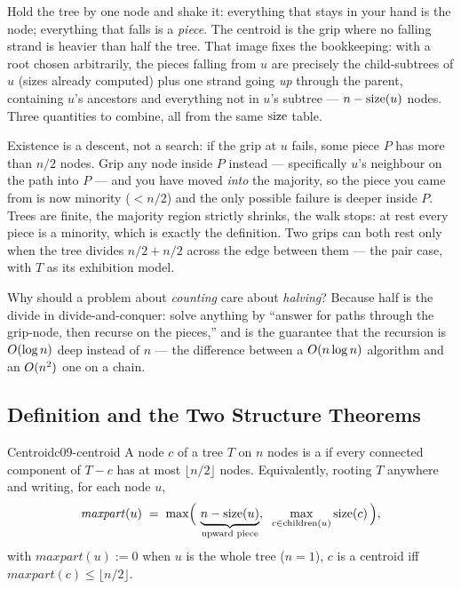 Hold the tree by one node and shake it: everything that stays in your hand is the node;
everything that falls is a \emph{piece}. The centroid is the grip where no falling strand
is heavier than half the tree. That image fixes the bookkeeping: with a root chosen
arbitrarily, the pieces falling from $u$ are precisely the child-subtrees of $u$ (sizes
already computed) plus one strand going \emph{up} through the parent, containing
$u$'s ancestors and everything not in $u$'s subtree --- $n - \operatorname{size}(u)$ nodes. Three
quantities to combine, all from the same $\operatorname{size}$ table.

Existence is a descent, not a search: if the grip at $u$ fails, some piece $P$ has more
than $n/2$ nodes. Grip any node inside $P$ instead --- specifically $u$'s neighbour on
the path into $P$ --- and you have moved \emph{into} the majority, so the piece you
came from is now minority ($< n/2$) and the only possible failure is deeper inside $P$.
Trees are finite, the majority region strictly shrinks, the walk stops: at rest every
piece is a minority, which is exactly the definition. Two grips can both rest only when
the tree divides $n/2 {+} n/2$ across the edge between them --- the pair case, with $T$
as its exhibition model.

Why should a problem about \emph{counting} care about \emph{halving}? Because half is
the divide in divide-and-conquer: solve anything by ``answer for paths through the
grip-node, then recurse on the pieces,'' and  is the guarantee
that the recursion is $O(\log n)$ deep instead of $n$ --- the difference between a
$O(n \log n)$ algorithm and an $O(n^2)$ one on a chain.

\subsection{Definition and the Two Structure Theorems}

\begin{definition}{Centroid}{c09-centroid}
A node $c$ of a tree $T$ on $n$ nodes is a  if every connected component
of $T - c$ has at most $\lfloor n/2 \rfloor$ nodes. Equivalently, rooting $T$ anywhere
and writing, for each node $u$,
\[
  \mathit{maxpart}(u) \;=\; \max\!\Big(\, \underbrace{n - \operatorname{size}(u)}_{\text{upward piece}},\;\;
        \max_{c \in \operatorname{children}(u)} \operatorname{size}(c) \,\Big),
\]
with $\mathit{maxpart}(u) := 0$ when $u$ is the whole tree ($n=1$), $c$ is a centroid
iff $\mathit{maxpart}(c) \le \lfloor n/2 \rfloor$.
\end{definition}

